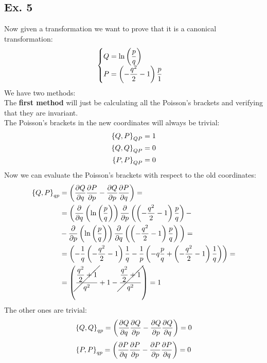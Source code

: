 \subsection{Ex. 5}
Now given a transformation we want to prove that it is a canonical transformation:
\begin{equation}
    \begin{cases}
        Q = \ln \left(\dfrac{p}{q}\right)\\
        P = \left(-\dfrac{q^2}{2}-1\right)\dfrac{p}{1}
    \end{cases}
\end{equation}
We have two methods:\\
The \textbf{first method} will just be calculating all the Poisson's brackets and verifying that they are invariant.\\
The Poisson's brackets in the new coordinates will always be trivial:
\begin{equation}
    \begin{split}
        \pb{Q}{P}_{QP} &= 1\\
        \pb{Q}{Q}_{QP} &= 0\\
        \pb{P}{P}_{QP} &= 0
    \end{split}
\end{equation}
Now we can evaluate the Poisson's brackets with respect to the old coordinates:
\begin{equation}
    \begin{split}
        \pb{Q}{P}_{qp} &= \left(\pdv{Q}{q} \pdv{P}{p} - \pdv{Q}{p} \pdv{P}{q} \right) = \\
        &= \bigg(\pdv{}{q}\left(\ln\brackets{\dfrac{p}{q}}\right) \pdv{}{p}\left(\brackets{-\dfrac{q^2}{2}-1}\dfrac{p}{q}\right) -\\
        &- \pdv{}{p}\left(\ln\brackets{\dfrac{p}{q}}\right) \pdv{}{q}\left(\brackets{-\dfrac{q^2}{2}-1}\dfrac{p}{q}\right) \bigg) = \\
        &= \left(-\dfrac{1}{q}  \brackets{-\dfrac{q^2}{2}-1}  \dfrac{1}{q} - \dfrac{1}{p}  \brackets{-q  \dfrac{p}{q} + \brackets{-\dfrac{q^2}{2}-1}  \dfrac{1}{q}} \right) = \\
        &= \left(\cancel{\dfrac{\dfrac{q^2}{2} + 1}{q^2}} + 1 - \cancel{\dfrac{\dfrac{q^2}{2} + 1}{q^2}} \right) = 1
    \end{split}
\end{equation}
The other ones are trivial:
\begin{equation}
    \pb{Q}{Q}_{qp} = \left(\pdv{Q}{q} \pdv{Q}{p} - \pdv{Q}{p} \pdv{Q}{q} \right) = 0
\end{equation}
\begin{equation}
    \pb{P}{P}_{qp} = \left(\pdv{P}{q} \pdv{P}{p} - \pdv{P}{p} \pdv{P}{q} \right) = 0
\end{equation}

